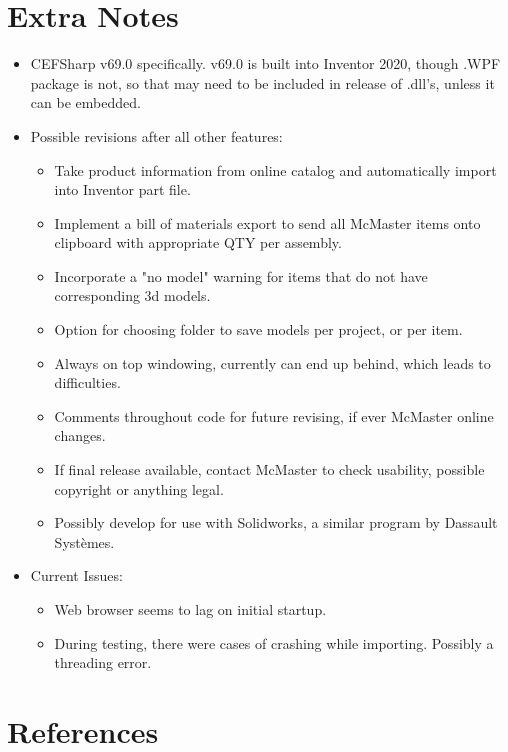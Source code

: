 \documentclass[12pt, letterpaper]{article}
\begin{document}
\section{Extra Notes}
\begin{itemize}
    \item CEFSharp v69.0 specifically. v69.0 is built into Inventor 2020, though .WPF package is not, so that may need to be included in release of .dll's, unless it can be embedded.
    \item Possible revisions after all other features:
    \begin{itemize}
        \item Take product information from online catalog and automatically import into Inventor part file.
        \item Implement a bill of materials export to send all McMaster items onto clipboard with appropriate QTY per assembly.
        \item Incorporate a "no model" warning for items that do not have corresponding 3d models.
        \item Option for choosing folder to save models per project, or per item.
        \item Always on top windowing, currently can end up behind, which leads to difficulties.
        \item Comments throughout code for future revising, if ever McMaster online changes.
        \item If final release available, contact McMaster to check usability, possible copyright or anything legal. 
        \item Possibly develop for use with Solidworks, a similar program by  Dassault Systèmes.
    \end{itemize}
    \item Current Issues:
    \begin{itemize}
        \item Web browser seems to lag on initial startup.
        \item During testing, there were cases of crashing while importing. Possibly a threading error.
    \end{itemize}
\end{itemize}
\section{References}
\begingroup
\renewcommand{\section}[2]{}


\endgroup
\newpage
\end{document}
